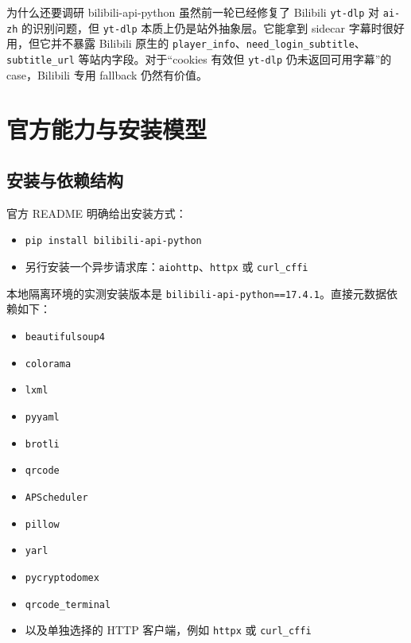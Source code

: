 \documentclass[a4paper]{article}
\begin{document}
\begin{evidencebox}{为什么还要调研 bilibili-api-python}
虽然前一轮已经修复了 Bilibili \texttt{yt-dlp} 对 \texttt{ai-zh} 的识别问题，但 \texttt{yt-dlp} 本质上仍是站外抽象层。它能拿到 sidecar 字幕时很好用，但它并不暴露 Bilibili 原生的 \texttt{player\_info}、\texttt{need\_login\_subtitle}、\texttt{subtitle\_url} 等站内字段。对于“cookies 有效但 \texttt{yt-dlp} 仍未返回可用字幕”的 case，Bilibili 专用 fallback 仍然有价值。
\end{evidencebox}

\section{官方能力与安装模型}

\subsection{安装与依赖结构}

官方 README 明确给出安装方式：
\begin{itemize}
\item \texttt{pip install bilibili-api-python}
\item 另行安装一个异步请求库：\texttt{aiohttp}、\texttt{httpx} 或 \texttt{curl\_cffi}
\end{itemize}

本地隔离环境的实测安装版本是 \texttt{bilibili-api-python==17.4.1}。直接元数据依赖如下：
\begin{itemize}
\item \texttt{beautifulsoup4}
\item \texttt{colorama}
\item \texttt{lxml}
\item \texttt{pyyaml}
\item \texttt{brotli}
\item \texttt{qrcode}
\item \texttt{APScheduler}
\item \texttt{pillow}
\item \texttt{yarl}
\item \texttt{pycryptodomex}
\item \texttt{qrcode\_terminal}
\item 以及单独选择的 HTTP 客户端，例如 \texttt{httpx} 或 \texttt{curl\_cffi}
\end{itemize}
\end{document}
